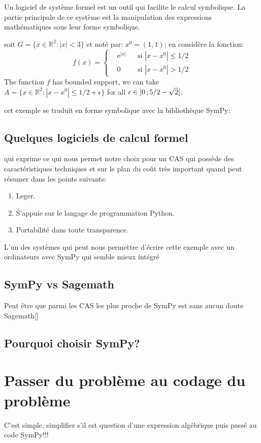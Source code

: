 \begin{definition}
Un logiciel de système formel est un outil qui facilite le calcul symbolique. La partie principale de ce système est la manipulation des expressions mathématiques sous leur forme symbolique.
\end{definition}

\begin{example}
soit $G=\{x\in\mathbb{R}^2:|x|<3\}$ et noté par: $x^0=(1,1)$; en considère la fonction:
\begin{equation}
f(x)=\left\{\begin{aligned} & \mathrm{e}^{|x|} & & \text{si $|x-x^0|\leq 1/2$}\\
& 0 & & \text{si $|x-x^0|> 1/2$}\end{aligned}\right.
\end{equation}
The function $f$ has bounded support, we can take $A=\{x\in\mathbb{R}^2:|x-x^0|\leq 1/2+\epsilon\}$ for all $\epsilon\in\mathopen{]}0\,;5/2-\sqrt{2}\mathclose{[}$.
\end{example}

cet exemple se traduit en forme symbolique avec la bibliothèque SymPy:

\subsection{Quelques logiciels de calcul formel}

qui exprime ce qui nous permet notre choix pour un CAS qui possède des caractéristiques techniques et sur le plan du coût très important quand peut résumer dans les points suivants:
\begin{enumerate}
	\item Leger. 
	\item S’appuie sur le langage de programmation Python.
	\item Portabilité dans toute transparence.
\end{enumerate}

L'un des systèmes qui peut nous permettre d'écrire cette exemple avec un ordinateurs avec SymPy qui semble mieux intégré
\subsection{SymPy vs Sagemath}
Peut être que parmi les CAS les plus proche de SymPy est sans aucun doute Sagemath[]
\subsection{Pourquoi choisir SymPy?}
\section{Passer du problème au codage du problème}
C'est simple, simplifier s'il est question d'une expression algébrique puis passé au code SymPy!!!
